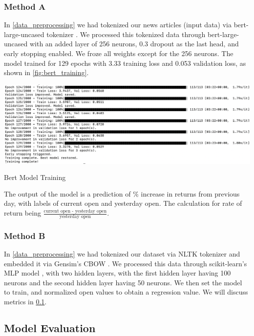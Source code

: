 \documentclass[twocolumn,12pt]{article}
\makeatletter
\newenvironment{figurehere}
  {\def\@captype{figure}}
  {}
\makeatother
\begin{document}
\begin{flushleft}
		\subsubsection{Method A \cite{metha}} \label{method_a}
		In \cref{data_preprocessing} we had tokenized our news articles (input data) via bert-large-uncased tokenizer \cite{bert}. We processed this tokenized data through bert-large-uncased \cite{bert} with an added layer of 256 neurons, 0.3 dropout as the last head, and early stopping enabled. We froze all weights except for the 256 neurons. The model trained for 129 epochs with 3.33 training loss and 0.053 validation loss, as shown in \cref{fig:bert_training}.
		
		\mbox{}
		\begin{figurehere}
			\centering
			\includegraphics[width=0.95\linewidth]{images/bert_training_mac.png}
			\caption{Bert Model Training}
			\label{fig:bert_training}
		\end{figurehere}
				
		The output of the model is a prediction of \% increase in returns from previous day, with labels of current open and yesterday open. The calculation for rate of return being $\frac{\text{current open - yesterday open}}{\text{yesterday open}}$.
		
		\subsubsection{Method B \cite{methb}} \label{method_b}
		In \cref{data_preprocessing} we had tokenized our dataset via NLTK tokenizer \cite{nltk} and embedded it via Gensim's CBOW \cite{gensim}. We processed this data through scikit-learn's MLP model \cite{skmlp}, with two hidden layers, with the first hidden layer having 100 neurons and the second hidden layer having 50 neurons. We then set the model to train, and normalized open values to obtain a regression value. We will discuss metrics in \cref{model_eval}.
	
	\subsection{Model Evaluation} \label{model_eval}

\end{flushleft}
\end{document}
